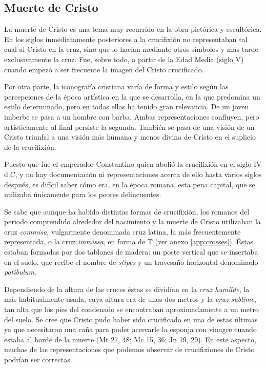 \subsection{Muerte de Cristo}
La muerte de Cristo es una tema muy recurrido en la obra pictórica y escultórica. En los siglos inmediatamente posteriores a la crucifixión no representaban tal cual al Cristo en la cruz, sino que lo hacían mediante otros símbolos y más tarde exclusivamente la cruz. Fue, sobre todo, a partir de la Edad Media (siglo V) cuando empezó a ser frecuente la imagen del Cristo crucificado.

Por otra parte, la iconografía cristiana varía de forma y estilo según las percepciones de la época artística en la que se desarrolla, en la que predomina un estilo determinado, pero en todas ellas ha tenido gran relevancia. De un joven imberbe se pasa a un hombre con barba. Ambas representaciones confluyen, pero artísticamente al final persiste la segunda. También se pasa de una visión de un Cristo triunfal a una visión más humana y menos divina de Cristo en el suplicio de la crucifixión.

Puesto que fue el emperador Constantino quien abolió la crucifixión en el siglo IV d.C, y no hay documentación ni representaciones acerca de ello hasta varios siglos después, es difícil saber cómo era, en la época romana, esta pena capital, que se utilizaba únicamente para los peores delincuentes.

Se sabe que aunque ha habido distintas formas de crucifixión, los romanos del periodo comprendido alrededor del nacimiento y la muerte de Cristo utilizaban la cruz \textit{commisa}, vulgarmente denominada cruz latina, la más frecuentemente representada, o la cruz \textit{immissa}, en forma de T (ver anexo \autoref{app:crosses}). Éstas estaban formadas por dos tablones de madera: un poste vertical que se insertaba en el suelo, que recibe el nombre de \textit{stipes} y un travesaño horizontal denominado \textit{patibulum}.%

Dependiendo de la altura de las cruces éstas se dividían en la \textit{cruz humilde}, la más habitualmente usada, cuya altura era de unos dos metros y la \textit{cruz sublime}, tan alta que los pies del condenado se encontraban aproximadamente a un metro del suelo. Se cree que Cristo pudo haber sido crucificado en una de estas últimas ya que necesitaron una caña para poder acercarle la esponja con vinagre cuando estaba al borde de la muerte (Mt 27, 48; Mc 15, 36; Jn 19, 29). En este aspecto, muchas de las representaciones que podemos observar de crucifixiones de Cristo podrían ser correctas.

